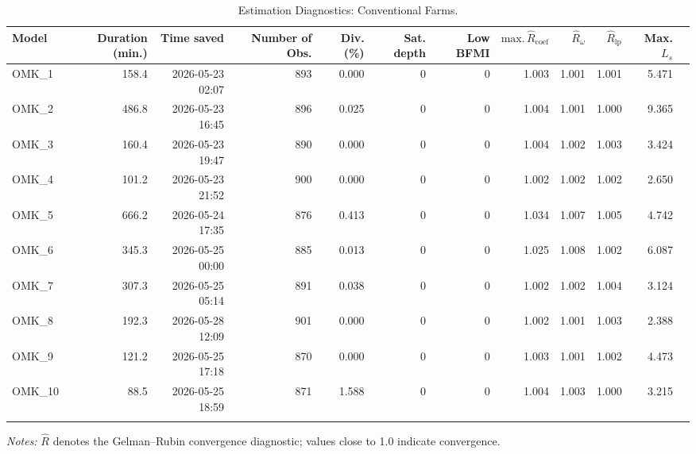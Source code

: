 \documentclass[12pt]{article}
\begin{document}
\begin{landscape}
\begin{table}[htbp]
\centering
\small
\caption{Estimation Diagnostics: Conventional Farms.}
\label{tab:est-diagnostics}
\begin{threeparttable}
\begin{tabular}{lrrrrrrrrrrr}
\toprule
Model & Duration (min.) & Time saved & Number of Obs. & Div. (\%) & Sat. depth & Low BFMI & $\text{max.} \, \hat{R}_{\text{coef}}$ & $\hat{R}_{\omega}$ & $\hat{R}_{\text{lp}}$ & Max. $L_s$ \\
\midrule
\addlinespace
OMK\_1  & 158.4 & 2026-05-23 02:07 & 893 & 0.000  & 0 & 0 & 1.003 & 1.001 & 1.001 & 5.471 \\
OMK\_2  & 486.8 & 2026-05-23 16:45 & 896 & 0.025  & 0 & 0 & 1.004 & 1.001 & 1.000 & 9.365 \\
OMK\_3  & 160.4 & 2026-05-23 19:47 & 890 & 0.000  & 0 & 0 & 1.004 & 1.002 & 1.003 & 3.424 \\
OMK\_4  & 101.2 & 2026-05-23 21:52 & 900 & 0.000  & 0 & 0 & 1.002 & 1.002 & 1.002 & 2.650 \\
OMK\_5  & 666.2 & 2026-05-24 17:35 & 876 & 0.413  & 0 & 0 & 1.034 & 1.007 & 1.005 & 4.742 \\
OMK\_6  & 345.3 & 2026-05-25 00:00 & 885 & 0.013  & 0 & 0 & 1.025 & 1.008 & 1.002 & 6.087 \\
OMK\_7  & 307.3 & 2026-05-25 05:14 & 891 & 0.038  & 0 & 0 & 1.002 & 1.002 & 1.004 & 3.124 \\
OMK\_8  & 192.3 & 2026-05-28 12:09 & 901 & 0.000  & 0 & 0 & 1.002 & 1.001 & 1.003 & 2.388 \\
OMK\_9  & 121.2 & 2026-05-25 17:18 & 870 & 0.000  & 0 & 0 & 1.003 & 1.001 & 1.002 & 4.473 \\
OMK\_10 & 88.5  & 2026-05-25 18:59 & 871 & 1.588  & 0 & 0 & 1.004 & 1.003 & 1.000 & 3.215 \\
\addlinespace
\bottomrule
\end{tabular}
\begin{tablenotes}
\footnotesize
\item \textit{Notes:} $\hat{R}$ denotes the Gelman--Rubin convergence diagnostic; values close to 1.0 indicate convergence.
\end{tablenotes}
\end{threeparttable}
\end{table}
\end{landscape}


\newpage
\end{document}
